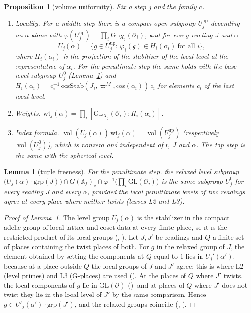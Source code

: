 \documentclass[11pt]{article}
\newcommand{\Ok}{\mathcal O}
\newcommand{\GL}{\mathrm{GL}}
\newcommand{\vol}{\operatorname{vol}}
\newcommand{\Af}{\mathbb A_{f}}
\newtheorem{proposition}[theorem]{Proposition}
\newtheorem{lemma}[theorem]{Lemma}
\theoremstyle{definition}
\theoremstyle{remark}
\begin{document}
\begin{proposition}[volume uniformity]\label{prop:V}
Fix a step $j$ and the family $a$.
\begin{enumerate}[label=(\roman*),itemsep=2pt]
\item \emph{Locality.} For a middle step there is a compact open subgroup $U^{\mathrm{up}}_j$ depending on $a$ alone with $\varphi(U^{\mathrm{up}}_j)=\prod_i\GL_{X_j}(\Ok_i)$, and for every reading $J$ and $\alpha$
\[
U_j(\alpha)=\big\{g\in U^{\mathrm{up}}_j:\ \varphi_i(g)\in H_i(\alpha_i)\ \text{for all } i\big\},
\]
where $H_i(\alpha_i)$ is the projection of the stabilizer of the local level at the representative of $\alpha_i$. For the penultimate step the same holds with the base level subgroup $U^{0}_j$ (Lemma~\ref{lem:tf}) and $H_i(\alpha_i)=c_i^{-1}\,\mathrm{cosStab}(J_i,\varpi^{M},\mathrm{cos}(\alpha_i))\,c_i$ for elements $c_i$ of the last local level.
\item \emph{Weights.} $\mathrm{wt}_j(\alpha)=\prod_i[\GL_{X_j}(\Ok_i):H_i(\alpha_i)]$.
\item \emph{Index formula.} $\vol(U_j(\alpha))\,\mathrm{wt}_j(\alpha)=\vol(U^{\mathrm{up}}_j)$ (respectively $\vol(U^0_j)$), which is nonzero and independent of $t$, $J$ and $\alpha$. The top step is the same with the spherical level.
\end{enumerate}
\end{proposition}

\begin{lemma}[tuple freeness]\label{lem:tf}
For the penultimate step, the relaxed level subgroup $\big(U_j(\alpha)\cdot\mathrm{grp}(J)\big)\cap G(\Af)_{\mathrm{c}}\cap\varphi^{-1}\big(\prod_i\GL(\Ok_i)\big)$ is the same subgroup $U^0_j$ for every reading $J$ and every $\alpha$, provided the local penultimate levels of two readings agree at every place where neither twists (leaves L2 and L3).
\end{lemma}

\begin{proof}[Proof of Lemma~\ref{lem:tf}]
The level group $U_j(\alpha)$ is the stabilizer in the compact adelic group of local lattice and coset data at every finite place, so it is the restricted product of its local groups (, ). Let $J,J'$ be readings and $Q$ a finite set of places containing the twist places of both. For $g$ in the relaxed group of $J$, the element obtained by setting the components at $Q$ equal to $1$ lies in $U_{j}'(\alpha')$, because at a place outside $Q$ the local groups of $J$ and $J'$ agree; this is where L2 (level primes) and L3 (G-places) are used (). At the places of $Q$ where $J'$ twists, the local components of $g$ lie in $\GL(\Ok)$ (), and at places of $Q$ where $J'$ does not twist they lie in the local level of $J'$ by the same comparison. Hence $g\in U'_j(\alpha')\cdot\mathrm{grp}(J')$, and the relaxed groups coincide (, ).
\end{proof}
\end{document}
